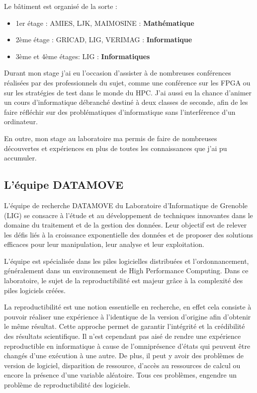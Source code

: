 \documentclass[a4paper,french,12pt, titlepage]{article}
\begin{document}
Le bâtiment est organisé de la sorte :

\begin{itemize}
\item
  1er étage : AMIES, LJK, MAIMOSINE : \textbf{Mathématique}
\item
  2ème étage : GRICAD, LIG, VERIMAG : \textbf{Informatique}
\item
  3ème et 4ème étages: LIG : \textbf{Informatiques}\newline
\end{itemize}

Durant mon stage j'ai eu l'occasion d'assister à de nombreuses
conférences réalisées par des professionnels du sujet, comme une
conférence sur les FPGA ou sur les stratégies de test dans le monde du
HPC. J'ai aussi eu la chance d'animer un cours d'informatique débranché
destiné à deux classes de seconde, afin de les faire réfléchir sur des
problématiques d'informatique sans l'interférence d'un
ordinateur.\newline

En outre, mon stage au laboratoire ma permis de faire de nombreuses
découvertes et expériences en plus de toutes les connaissances que j'ai
pu accumuler.

\hypertarget{luxe9quipe-datamove}{%
\subsection{L'équipe DATAMOVE}\label{luxe9quipe-datamove}}

L'équipe de recherche DATAMOVE du Laboratoire d'Informatique de Grenoble
(LIG) se consacre à l'étude et au développement de techniques innovantes
dans le domaine du traitement et de la gestion des données. Leur
objectif est de relever les défis liés à la croissance exponentielle des
données et de proposer des solutions efficaces pour leur manipulation,
leur analyse et leur exploitation.\newline

L'équipe est spécialisée dans les piles logicielles distribuées et
l'ordonnancement, généralement dans un environnement de High Performance
Computing. Dans ce laboratoire, le sujet de la reproductibilité est
majeur grâce à la complexité des piles logiciels créées.\newline

La reproductibilité est une notion essentielle en recherche, en effet
cela consiste à pouvoir réaliser une expérience à l'identique de la
version d'origine afin d'obtenir le même résultat. Cette approche permet
de garantir l'intégrité et la crédibilité des résultats scientifique. Il
n'est cependant pas aisé de rendre une expérience reproductible en
informatique à cause de l'omniprésence d'états qui peuvent être changés
d'une exécution à une autre. De plus, il peut y avoir des problèmes de
version de logiciel, disparition de ressource, d'accès au ressources de
calcul ou encore la présence d'une variable aléatoire. Tous ces
problèmes, engendre un problème de reproductibilité des
logiciels.\newline
\end{document}
